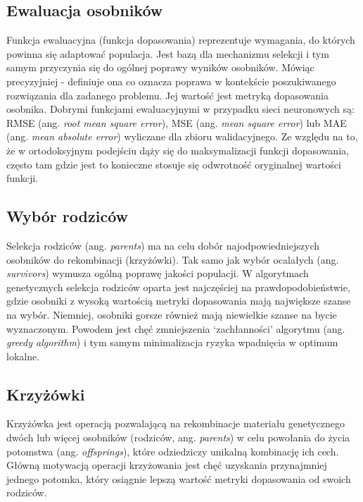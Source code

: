 \documentclass[a4paper,11pt]{article}
\begin{document}
    \subsection{Ewaluacja osobników}

    Funkcja ewaluacyjna (funkcja dopasowania) reprezentuje wymagania, do których powinna się adaptować populacja. Jest bazą dla mechanizmu selekcji i tym samym przyczynia się do ogólnej poprawy wyników osobników. Mówiąc precyzyjniej - definiuje ona co oznacza poprawa w kontekście poszukiwanego rozwiązania dla zadanego problemu. Jej wartość jest metryką dopasowania osobnika\cite{IntroductionToEvolutionaryComputing2015}. Dobrymi funkcjami ewaluacyjnymi w przypadku sieci neuronowych są: RMSE (ang. \textit{root mean square error}), MSE (ang. \textit{mean square error}) lub MAE (ang. \textit{mean absolute error}) wyliczane dla zbioru walidacyjnego. Ze względu na to, że w ortodoksyjnym podejściu dąży się do maksymalizacji funkcji dopasowania, często tam gdzie jest to konieczne stosuje się odwrotność oryginalnej wartości funkcji\cite{IntroductionToEvolutionaryComputing2015}.

    \subsection{Wybór rodziców}

    Selekcja rodziców (ang. \textit{parents}) ma na celu dobór najodpowiedniejszych osobników do rekombinacji (krzyżówki). Tak samo jak wybór ocalałych (ang. \textit{survivors}) wymusza ogólną poprawę jakości populacji. W algorytmach genetycznych selekcja rodziców oparta jest najczęściej na prawdopodobieństwie, gdzie osobniki z wysoką wartością metryki dopasowania mają największe szanse na wybór. Niemniej, osobniki gorsze również mają niewielkie szanse na bycie wyznaczonym. Powodem jest chęć zmniejszenia `zachłanności' algorytmu (ang. \textit{greedy algorithm}) i tym samym minimalizacja ryzyka wpadnięcia w optimum lokalne\cite{IntroductionToEvolutionaryComputing2015}.

    \subsection{Krzyżówki}

    Krzyżówka jest operacją pozwalającą na rekombinacje materiału genetycznego dwóch lub więcej osobników (rodziców, ang. \textit{parents}) w celu powołania do życia potomstwa (ang. \textit{offsprings}), które odziedziczy unikalną kombinację ich cech. Główną motywacją operacji krzyżowania jest chęć uzyskania przynajmniej jednego potomka, który osiągnie lepszą wartość metryki dopasowania od swoich rodziców\cite{GeneticAlgorithmEssentials2017}.
\end{document}

